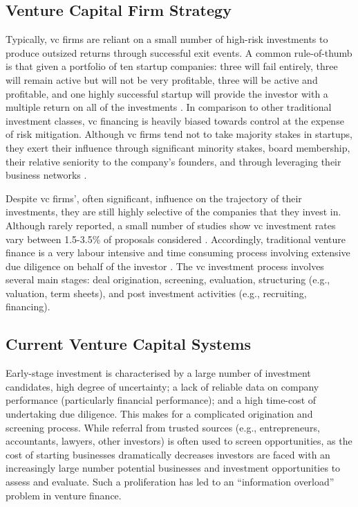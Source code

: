 \documentclass[../thesis/thesis.tex]{subfiles}
\begin{document}
\begin{figure}[!htb]
    \centering
    \caption{} %
    \label{fig:litreview:criteria:fund_structure}
\end{figure}

\subsection{Venture Capital Firm Strategy}

Typically, \gls{vc} firms are reliant on a small number of high-risk investments to produce outsized returns through successful exit events. A common rule-of-thumb is that given a portfolio of ten startup companies: three will fail entirely, three will remain active but will not be very profitable, three will be active and profitable, and one highly successful startup will provide the investor with a multiple return on all of the investments \cite{stone2014}. In comparison to other traditional investment classes, \gls{vc} financing is heavily biased towards control at the expense of risk mitigation. Although \gls{vc} firms tend not to take majority stakes in startups, they exert their influence through significant minority stakes, board membership, their relative seniority to the company’s founders, and through leveraging their business networks \cite{fried2006}.

Despite \gls{vc} firms’, often significant, influence on the trajectory of their investments, they are still highly selective of the companies that they invest in. Although rarely reported, a small number of studies show \gls{vc} investment rates vary between 1.5-3.5\% of proposals considered \cite{stone2014}. Accordingly, traditional venture finance is a very labour intensive and time consuming process involving extensive due diligence on behalf of the investor \cite{fried1994}. The \gls{vc} investment process involves several main stages: deal origination, screening, evaluation, structuring (e.g., valuation, term sheets), and post investment activities (e.g., recruiting, financing).

\subsection{Current Venture Capital Systems}

Early-stage investment is characterised by a large number of investment candidates, high degree of uncertainty; a lack of reliable data on company performance (particularly financial performance); and a high time-cost of undertaking due diligence. This makes for a complicated origination and screening process. While referral from trusted sources (e.g., entrepreneurs, accountants, lawyers, other investors) is often used to screen opportunities, as the cost of starting businesses dramatically decreases investors are faced with an increasingly large number potential businesses and investment opportunities to assess and evaluate. Such a proliferation has led to an “information overload” problem in venture finance.
\end{document}
